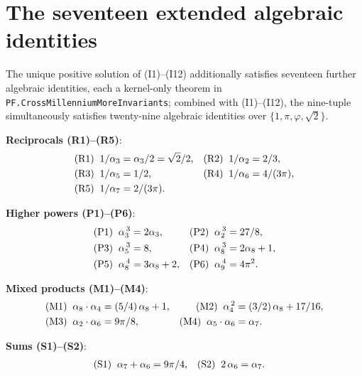 \documentclass[11pt,a4paper]{amsart}
\theoremstyle{plain}
\theoremstyle{definition}
\begin{document}
\section{The seventeen extended algebraic identities}\label{app:extended}

The unique positive solution of (I1)--(I12) additionally satisfies seventeen further algebraic identities, each a kernel-only theorem in \texttt{PF.CrossMillenniumMoreInvariants}; combined with (I1)--(I12), the nine-tuple simultaneously satisfies twenty-nine algebraic identities over $\{1, \pi, \varphi, \sqrt{2}\}$.

\noindent\textbf{Reciprocals \textup{(R1)--(R5)}}:
\begin{align*}
\textup{(R1)}\;\; 1/\alpha_3     &= \alpha_3 / 2 = \sqrt{2}/2,&
\textup{(R2)}\;\; 1/\alpha_2    &= 2/3,\\
\textup{(R3)}\;\; 1/\alpha_5    &= 1/2,&
\textup{(R4)}\;\; 1/\alpha_6   &= 4/(3\pi),\\
\textup{(R5)}\;\; 1/\alpha_7    &= 2/(3\pi).
\end{align*}

\noindent\textbf{Higher powers \textup{(P1)--(P6)}}:
\begin{align*}
\textup{(P1)}\;\; \alpha_3^{\,3}      &= 2\alpha_3,             & \textup{(P2)}\;\; \alpha_2^{\,3}     &= 27/8,\\
\textup{(P3)}\;\; \alpha_5^{\,3}     &= 8,                    & \textup{(P4)}\;\; \alpha_8^{\,3}  &= 2\alpha_8 + 1,\\
\textup{(P5)}\;\; \alpha_8^{\,4}  &= 3\alpha_8 + 2, & \textup{(P6)}\;\; \alpha_9^{\,4}     &= 4\pi^2.
\end{align*}

\noindent\textbf{Mixed products \textup{(M1)--(M4)}}:
\begin{align*}
\textup{(M1)}\;\; \alpha_8\cdot\alpha_4 &= (5/4)\,\alpha_8 + 1, & \textup{(M2)}\;\; \alpha_4^{\,2}              &= (3/2)\,\alpha_8 + 17/16,\\
\textup{(M3)}\;\; \alpha_2\cdot\alpha_6    &= 9\pi/8,                              & \textup{(M4)}\;\; \alpha_5\cdot\alpha_6  &= \alpha_7.
\end{align*}

\noindent\textbf{Sums \textup{(S1)--(S2)}}:
\begin{align*}
\textup{(S1)}\;\; \alpha_7 + \alpha_6  &= 9\pi/4,&
\textup{(S2)}\;\; 2\,\alpha_6     &= \alpha_7.
\end{align*}
\end{document}
